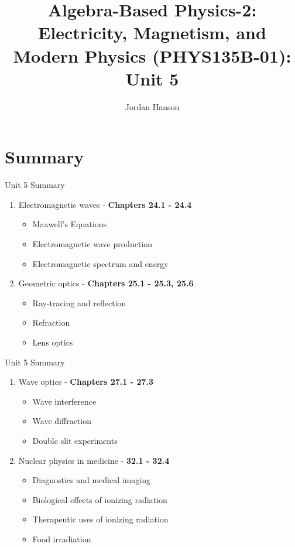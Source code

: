 \documentclass{beamer}
\title{Algebra-Based Physics-2: Electricity, Magnetism, and Modern Physics (PHYS135B-01): Unit 5}
\author{Jordan Hanson}
\institute{Whittier College Department of Physics and Astronomy}
\begin{document}
\maketitle

\section{Summary}

\begin{frame}{Unit 5 Summary}
\begin{enumerate}
\item Electromagnetic waves - \textbf{Chapters 24.1 - 24.4}
\begin{itemize}
\item Maxwell's Equations
\item Electromagnetic wave production
\item Electromagnetic spectrum and energy
\end{itemize}
\item Geometric optics - \textbf{Chapters 25.1 - 25.3, 25.6}
\begin{itemize}
\item Ray-tracing and reflection
\item Refraction
\item Lens optics
\end{itemize}
\end{enumerate}
\end{frame}

\begin{frame}{Unit 5 Summary}
\begin{enumerate}
\item Wave optics - \textbf{Chapters 27.1 - 27.3}
\begin{itemize}
\item Wave interference
\item Wave diffraction
\item Double slit experiments
\end{itemize}
\item Nuclear physics in medicine - \textbf{32.1 - 32.4}
\begin{itemize}
\item Diagnostics and medical imaging
\item Biological effects of ionizing radiation
\item Therapeutic uses of ionizing radiation
\item Food irradiation
\end{itemize}
\end{enumerate}
\end{frame}
\end{document}
